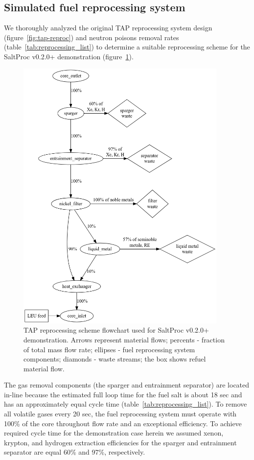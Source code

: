 \documentclass[12pt]{article} %
\begin{document}
\subsection{Simulated fuel reprocessing system}
We thoroughly analyzed the original \gls{TAP} reprocessing system design 
(figure~\ref{fig:tap-reproc}) and neutron poisons removal rates 
(table~\ref{tab:reprocessing_list}) to determine a suitable reprocessing 
scheme for the SaltProc v0.2.0+ demonstration 
(figure~\ref{fig:demo-repro-scheme}).
\begin{figure}[htp!] %
  \centering
		  \includegraphics[width=0.93\textwidth]{demo_reprocessing_scheme.png}
  \caption{\gls{TAP} reprocessing scheme flowchart used for SaltProc v0.2.0+ 
  demonstration. Arrows represent material flows; percents - fraction of total 
  mass flow rate; ellipses - fuel reprocessing system 
  components; diamonds - waste streams; the box shows refuel material flow.}
  \label{fig:demo-repro-scheme}
\end{figure}

The gas removal components (the sparger and entrainment separator) are located 
in-line because the estimated full loop time for the fuel salt is about 
18 sec and has an approximately equal cycle time 
(table~\ref{tab:reprocessing_list}). 
To remove all volatile gases every 20 sec, the fuel reprocessing system must 
operate with 100\% of the core throughout flow rate and an exceptional 
efficiency. To achieve required cycle time for the demonstration case herein 
we assumed xenon, krypton, and hydrogen extraction efficiencies for the 
sparger and entrainment separator are equal 60\% and 97\%, respectively.
\end{document}
